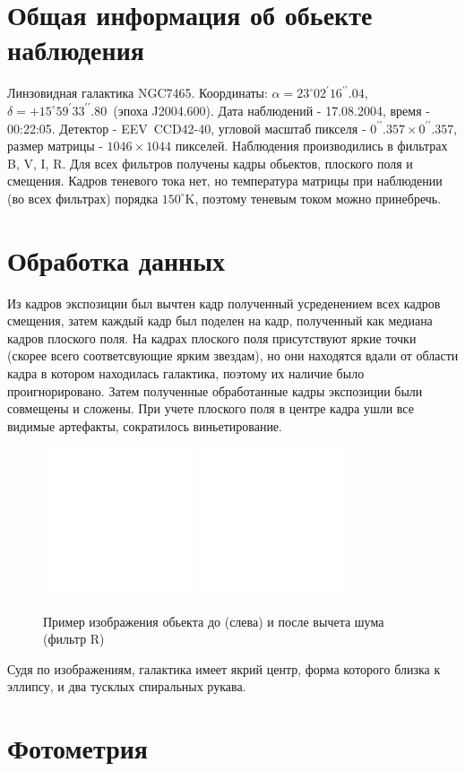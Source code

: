 \documentclass [12pt, a4paper] {article}
\theoremstyle{definition}
\begin{document}
	\section{Общая информация об обьекте наблюдения}
	Линзовидная галактика NGC7465. Координаты: $\alpha=23^{\circ} 02^{\prime} 16^{\prime \prime}.04$, $\delta = +15^{\circ}59^{\prime}33^{\prime \prime}.80$~(эпоха J2004.600). Дата наблюдений - 17.08.2004, время - 00:22:05. Детектор - EEV~CCD42-40, угловой масштаб пикселя - $0^{\prime \prime}.357\times0^{\prime \prime}.357$, размер матрицы - $1046\times1044$ пикселей. Наблюдения производились в фильтрах B, V, I, R. Для всех фильтров получены кадры обьектов, плоского поля и смещения. Кадров теневого тока нет, но температура матрицы при наблюдении (во всех фильтрах) порядка $150^\circ$K, поэтому теневым током можно принебречь.
	\section{Обработка данных}
	Из кадров экспозиции был вычтен кадр полученный усреденением всех кадров смещения, затем каждый кадр был поделен на кадр, полученный как медиана кадров плоского поля. На кадрах плоского поля присутствуют яркие точки (скорее всего соответсвующие ярким звездам), но они находятся вдали от области кадра в котором находилась галактика, поэтому их наличие было проигнорировано. Затем полученные обработанные кадры экспозиции были совмещены и сложены. 
	При учете плоского поля в центре кадра ушли все видимые артефакты, сократилось виньетирование. 
	\begin{figure}[!b] 
	\centering
			\includegraphics[width = 0.39\textwidth]{result.png}
			\includegraphics[width = 0.39\textwidth]{result_w_noize.png}
			\caption{Пример изображения обьекта до (слева) и после вычета шума (фильтр R) }
	\end{figure}
	\par Судя по изображениям, галактика имеет якрий центр, форма которого близка к эллипсу, и два тусклых спиральных рукава.
	\section{Фотометрия}
\end{document}
